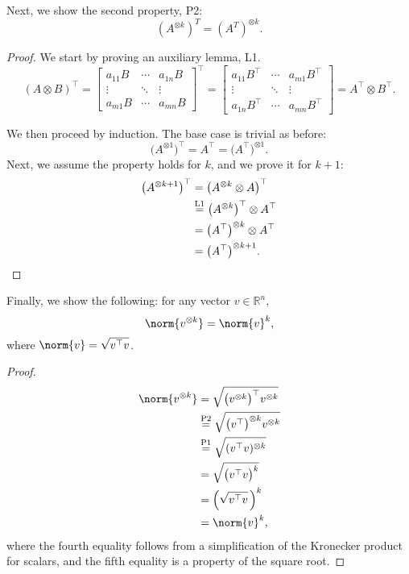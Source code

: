 \documentclass[11pt]{article}
\newcommand{\kp}{\otimes} %
\begin{document}
Next, we show the second property, P2:
\[(A^{\kp k})^T = (A^T)^{\kp k}.
\]
\begin{proof}
We start by proving an auxiliary lemma, L1.
\[
(A \kp B)^\top = \begin{bmatrix}
a_{11} B & \cdots & a_{1n}B \\
\vdots & \ddots & \vdots \\
a_{m1} B & \cdots & a_{mn} B
\end{bmatrix}^\top = \begin{bmatrix}
a_{11} B^\top & \cdots & a_{m1}B^\top \\
\vdots & \ddots & \vdots \\
a_{1n} B^\top & \cdots & a_{mn} B^\top
\end{bmatrix} = A^\top \kp B^\top.
\]

We then proceed by induction.
The base case is trivial as before:
\[
\big(A^{\kp 1}\big)^\top = A^\top = \big(A^\top\big)^{\kp 1}.
\]
Next, we assume the property holds for $k$, and we prove it for $k+1$:
\begin{align*}
\big(A^{\kp k+1}\big)^\top &= \big(A^{\kp k} \kp A\big)^\top\\
&\overset{\textnormal{L1}}{=} \big(A^{\kp k}\big)^\top \kp A^\top\\
&= \big(A^\top\big)^{\kp k} \kp A^\top\\
&= \big(A^\top\big)^{\kp k+1}.\qedhere
\end{align*}
\end{proof}

Finally, we show the following:
for any vector \(v \in \mathbb{R}^n\),
\[
\norm{v^{\kp k}} = \norm{v}^{k},
\]
where \(\norm{v} = \sqrt{v^\top v}\).
\begin{proof}
\begin{align*}
\norm{v^{\kp k}} &= \sqrt{\big(v^{\kp k}\big)^\top v^{\kp k}}\\
&\overset{\textnormal{P2}}{=} \sqrt{\big(v^\top\big)^{\kp k} v^{\kp k}}\\
&\overset{\textnormal{P1}}{=} \sqrt{(v^\top v)^{\kp k}}\\
&= \sqrt{\big(v^\top v\big)^k}\\
&= \Big(\sqrt{v^\top v}\,\Big)^k\\
&= \norm{v}^k,
\end{align*}
where the fourth equality follows from a simplification of the Kronecker product for scalars, and the fifth equality is a property of the square root.
\end{proof}
\end{document}
